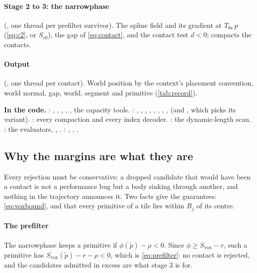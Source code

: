 \paragraph{Stage 2 to 3: the narrowphase} (, one thread per prefilter survivor). The spline field and its gradient at $T_{ba}\, p$ (\cref{eq:c2}, or $S_{\mathrm{c0}}$), the gap of \cref{eq:contact}, and the contact test $d < 0$;  compacts the contacts.

\paragraph{Output} (, one thread per contact). World position by the context's placement convention, world normal, gap, world, segment and primitive (\cref{tab:record}).

\begin{codebox}
\textbf{In the code.} : , , , , , the capacity tools. : , , , , , , , ,  (and , which picks its variant). : every compaction and every  index decoder. : the dynamic-length scan. : the evaluators, , . : , , .
\end{codebox}

\subsection{Why the margins are what they are}\label{sec:margins}

Every rejection must be conservative: a dropped candidate that would have been a contact is not a performance bug but a body sinking through another, and nothing in the trajectory announces it. Two facts give the guarantees: \cref{eq:voxbound}, and that every primitive of a tile lies within $R_j$ of its centre.

\paragraph{The prefilter} The narrowphase keeps a primitive if $\phi(\tilde p) - \rho < 0$. Since $\phi \ge S_{\mathrm{vox}} - r$, such a primitive has $S_{\mathrm{vox}}(\tilde p) - r - \rho < 0$, which is \cref{eq:prefilter}: no contact is rejected, and the candidates admitted in excess are what stage 3 is for.

